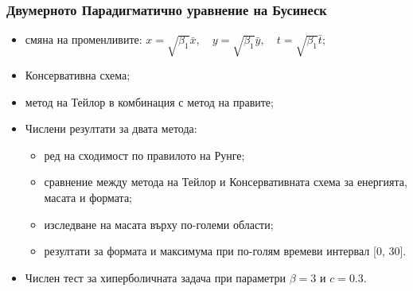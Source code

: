 \documentclass{beamer}
\begin{document}



\begin{frame}
\frametitle{Двумерното Парадигматично уравнение на Бусинеск}
 
\begin{itemize}
  \item смяна на променливите:
$
x = \sqrt{\beta_1} \bar{x}, \quad y = \sqrt{\beta_1} \bar{y}, \quad t = \sqrt{\beta_1} \bar{t};
$
  \item Консервативна схема;
  \item метод на Тейлор в комбинация с метод на правите;
  \item Числени резултати за двата метода:
  \begin{itemize}
	  \item ред на сходимост по правилото на Рунге;  
	  \item сравнение между метода на Тейлор и Консервативната схема за енергията, масата и формата;
	  \item изследване на масата върху по-големи области;
	  \item резултати за формата и максимума при по-голям времеви интервал [0, 30].
	\end{itemize}
  \item Числен тест за хиперболичната задача при параметри $\beta = 3$ и $c=0.3$.
\end{itemize}

\end{frame}
\end{document}
